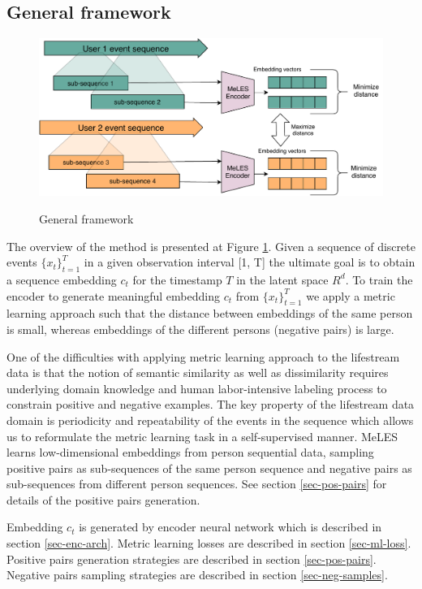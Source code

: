 \documentclass[sigconf, anonymous]{acmart}
\begin{document}
\subsection{General framework}

\begin{figure}[ht]
  \caption{General framework}
  \includegraphics[scale=0.85]{figures/arch-v2.pdf}
  \label{fig-arch}
\end{figure}

The overview of the method is presented at Figure \ref{fig-arch}. Given a sequence of discrete events $\{x_t \}^T_{t=1}$ in a given observation interval [1, T] the ultimate goal is to obtain a sequence embedding $c_t$ for the timestamp $T$ in the latent space $R^d$. To train the encoder to generate meaningful embedding $c_t$ from $\{x_t \}^T_{t=1}$ we apply a metric learning approach such that the distance between embeddings of the same person is small, whereas embeddings of the different persons (negative pairs) is large.

One of the difficulties with applying metric learning approach to the lifestream data is that the notion of semantic similarity as well as dissimilarity requires underlying domain knowledge and human labor-intensive labeling process to constrain positive and negative examples. 
The key property of the lifestream data domain is periodicity and repeatability of the events in the sequence which allows us to reformulate the metric learning task in a self-supervised manner. MeLES learns low-dimensional embeddings from person sequential data, sampling positive pairs as sub-sequences of the same person sequence and negative pairs as sub-sequences from different person sequences. See section \ref{sec-pos-pairs} for details of the positive pairs generation.

Embedding $c_t$ is generated by encoder neural network which is described in section \ref{sec-enc-arch}. Metric learning losses are described in section \ref{sec-ml-loss}. Positive pairs generation strategies are described in section \ref{sec-pos-pairs}. Negative pairs sampling strategies are described in section \ref{sec-neg-samples}.
\end{document}
